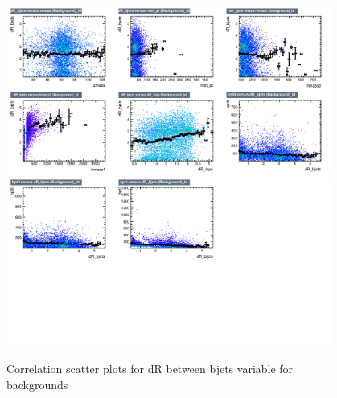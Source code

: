 \begin{figure}[!htb]%
\centering
\includegraphics[width=0.95\textwidth]{figures/CRDY/dataset/plots/correlationscatter_dR_bjets__Id_c3.pdf}
\includegraphics[width=0.95\textwidth]{figures/CRDY/dataset/plots/correlationscatter_dR_bjets__Id_c4.pdf}
\caption{ Correlation scatter plots for dR between bjets variable for backgrounds}%
\label{fig:correlations_CRDY_drbjets_BG}                                                       
\end{figure}




